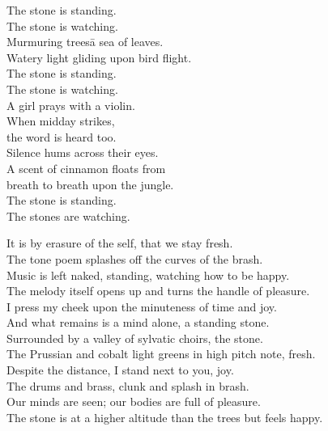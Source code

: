 
\settowidth{\versewidth}{The sounds made, speak for themselves, they are kind and brash.}
\bgroup\parindent 0pt\parskip 0pt

\prelude

\begin{center}
  
The stone is standing.\\
The stone is watching.\\
Murmuring trees\=a sea of leaves.\\
Watery light gliding upon bird flight.\\
The stone is standing.\\
The stone is watching.\\
A girl prays with a violin.\\
When midday strikes,\\
the word is heard too.\\
Silence hums across their eyes.\\
A scent of cinnamon floats from\\
breath to breath upon the jungle.\\
The stone is standing.\\
The stones are watching.\\

\end{center}

\fugue
  
It is by erasure of the self, that we stay fresh.\\
The tone poem splashes off the curves of the brash.\\
Music is left naked, standing, watching how to be happy.\\
The melody itself opens up and turns the handle of pleasure.\\
I press my cheek upon the minuteness of time and joy.\\
And what remains is a mind alone, a standing stone.\\[8pt plus 2pt]

Surrounded by a valley of sylvatic choirs, the stone.\\
The Prussian and cobalt light greens in high pitch note, fresh.\\
Despite the distance, I stand next to you, joy.\\
The drums and brass, clunk and splash in brash.\\
Our minds are seen; our bodies are full of pleasure.\\
The stone is at a higher altitude than the trees but feels happy.\\[8pt plus 2pt]

